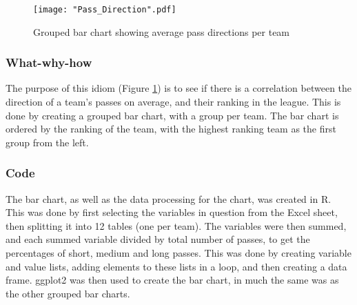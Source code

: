 \documentclass[Report.tex]{subfiles}
\begin{document}
\begin{figure}
\center
\texttt{[image: "Pass\_Direction".pdf]}
\caption{Grouped bar chart showing average pass directions per team}
\label{Fig:Pass_Direction} 
\end{figure}

\subsubsection{What-why-how}
The purpose of this idiom (Figure \ref{Fig:Pass_Direction}) is to see if there is a correlation between the
direction of a team's passes on average, and their ranking in the league. 
This is done by creating a grouped bar chart, with a group per team. The bar
chart is ordered by the ranking of the team, with the highest ranking team as
the first group from the left.


\subsubsection{Code}
The bar chart, as well as the data processing for the chart, was created in R.
This was done by first selecting the variables in question from the Excel sheet,
then splitting it into 12 tables (one per team). The variables were then
summed, and each summed variable divided by total number of passes, to get the
percentages of short, medium and long passes. This was done by creating
variable and value lists, adding elements to these lists in a loop, and then
creating a data frame. 
ggplot2 was then used to create the bar chart, in much the same was as the other
grouped bar charts. 
\end{document}
